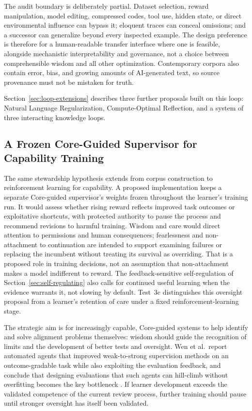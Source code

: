 \documentclass[11pt]{article}
\begin{document}
			The audit boundary is deliberately partial. Dataset selection, reward manipulation, model editing, compressed codes, tool use, hidden state, or direct environmental influence can bypass it; eloquent traces can conceal omissions; and a successor can generalize beyond every inspected example. The design preference is therefore for a human-readable transfer interface where one is feasible, alongside mechanistic interpretability and governance, not a choice between comprehensible wisdom and all other optimization. Contemporary corpora also contain error, bias, and growing amounts of AI-generated text, so source provenance must not be mistaken for truth.

Section~\ref{sec:loop-extensions} describes three further proposals built on
this loop: Natural Language Regularization, Compute-Optimal Reflection, and a
system of three interacting knowledge loops.

\subsection{A Frozen Core-Guided Supervisor for Capability Training}\label{sec:rl-supervisor}

The same stewardship hypothesis extends from corpus construction to
reinforcement learning for capability. A proposed implementation keeps a
separate Core-guided supervisor's weights frozen throughout the learner's
training run. It would assess whether rising reward reflects improved task
outcomes or exploitative shortcuts, with protected authority to pause the
process and recommend revisions to harmful training.
Wisdom and care would direct attention to permissions and human consequences;
fearlessness and non-attachment to continuation are intended to support
examining failures or replacing the incumbent without treating its survival as
overriding. That is a proposed role in training decisions, not an assumption
that non-attachment makes a model indifferent to reward. The feedback-sensitive
self-regulation of Section~\ref{sec:self-regulating} also calls for continued
useful learning when the evidence warrants it, not slowing by default.
Test~3c distinguishes this oversight proposal from a learner's retention of
care under a fixed reinforcement-learning stage.

The strategic aim is for increasingly capable, Core-guided systems to help
identify and solve alignment problems themselves: wisdom should guide the
recognition of limits and the development of better tests and oversight. Wen
et al.\ report automated agents that improved weak-to-strong supervision
methods on an outcome-gradable task while also exploiting the evaluation
feedback, and conclude that designing evaluations that such agents can hill-climb
without overfitting becomes the key bottleneck \cite{wen2026automatedw2s}. If
learner development exceeds the validated competence of the current review
process, further training should pause until stronger oversight has itself
been validated.
\end{document}
